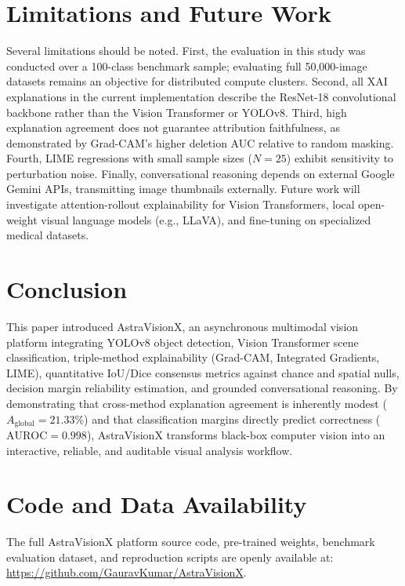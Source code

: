 \documentclass[journal,10pt,twocolumn]{IEEEtran}
\begin{document}
\section{Limitations and Future Work}
Several limitations should be noted. First, the evaluation in this study was conducted over a 100-class benchmark sample; evaluating full 50,000-image datasets remains an objective for distributed compute clusters. Second, all XAI explanations in the current implementation describe the ResNet-18 convolutional backbone rather than the Vision Transformer or YOLOv8. Third, high explanation agreement does not guarantee attribution faithfulness, as demonstrated by Grad-CAM's higher deletion AUC relative to random masking. Fourth, LIME regressions with small sample sizes ($N=25$) exhibit sensitivity to perturbation noise. Finally, conversational reasoning depends on external Google Gemini APIs, transmitting image thumbnails externally. Future work will investigate attention-rollout explainability for Vision Transformers, local open-weight visual language models (e.g., LLaVA), and fine-tuning on specialized medical datasets.

\section{Conclusion}
This paper introduced AstraVisionX, an asynchronous multimodal vision platform integrating YOLOv8 object detection, Vision Transformer scene classification, triple-method explainability (Grad-CAM, Integrated Gradients, LIME), quantitative IoU/Dice consensus metrics against chance and spatial nulls, decision margin reliability estimation, and grounded conversational reasoning. By demonstrating that cross-method explanation agreement is inherently modest ($A_{\text{global}} = 21.33\%$) and that classification margins directly predict correctness ($\text{AUROC} = 0.998$), AstraVisionX transforms black-box computer vision into an interactive, reliable, and auditable visual analysis workflow.

\section*{Code and Data Availability}
The full AstraVisionX platform source code, pre-trained weights, benchmark evaluation dataset, and reproduction scripts are openly available at: \url{https://github.com/GauravKumar/AstraVisionX}.
\end{document}
